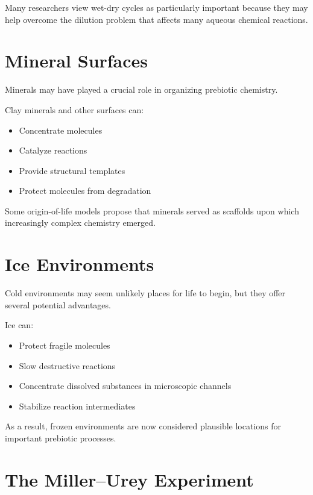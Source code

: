 \documentclass[
  oneside,
  openany]{book}
\providecommand{\tightlist}{%
  \setlength{\itemsep}{0pt}\setlength{\parskip}{0pt}}
\begin{document}
Many researchers view wet-dry cycles as particularly important because they may help overcome the dilution problem that affects many aqueous chemical reactions.

\section{Mineral Surfaces}\label{mineral-surfaces}

Minerals may have played a crucial role in organizing prebiotic chemistry.

Clay minerals and other surfaces can:

\begin{itemize}
\tightlist
\item
  Concentrate molecules
\item
  Catalyze reactions
\item
  Provide structural templates
\item
  Protect molecules from degradation
\end{itemize}

Some origin-of-life models propose that minerals served as scaffolds upon which increasingly complex chemistry emerged.

\section{Ice Environments}\label{ice-environments}

Cold environments may seem unlikely places for life to begin, but they offer several potential advantages.

Ice can:

\begin{itemize}
\tightlist
\item
  Protect fragile molecules
\item
  Slow destructive reactions
\item
  Concentrate dissolved substances in microscopic channels
\item
  Stabilize reaction intermediates
\end{itemize}

As a result, frozen environments are now considered plausible locations for important prebiotic processes.

\section{The Miller--Urey Experiment}\label{the-millerurey-experiment}
\end{document}
